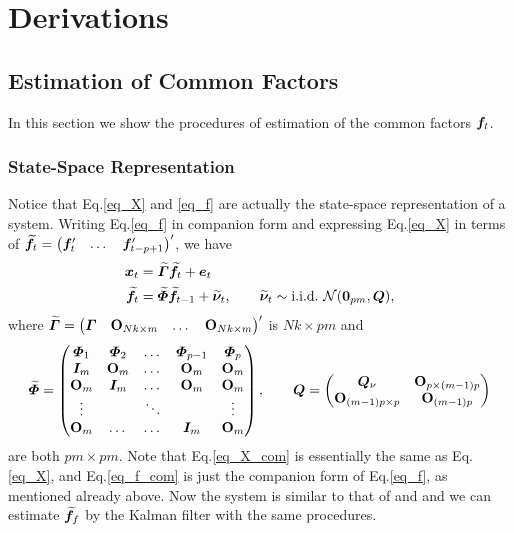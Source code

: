 \section{Derivations}
\subsection{Estimation of Common Factors}
In this section we show the procedures of estimation of the common factors $\bm f_t$. 
\subsubsection{State-Space Representation}
Notice that Eq.\eqref{eq_X} and \eqref{eq_f} are actually the state-space representation of a system. Writing Eq.\eqref{eq_f} in companion form and expressing Eq.\eqref{eq_X} in terms of 
$\widetilde{\bm f}_t=
	\begin{pmatrix}
		\bm f_t'&\dots&\bm f_{t-p+1}'
	\end{pmatrix}'$,
we have
\begin{align}
\label{eq_X_com}
	\bm x_t&=\widetilde{\bm \varGamma}\widetilde{\bm f}_t+\bm e_t\\
\label{eq_f_com}
	\widetilde{\bm f}_t&=\widetilde{\bm \varPhi}\widetilde{\bm f}_{t-1}+\widetilde{\bm \nu}_t,\qquad
		\widetilde{\bm \nu}_t\sim\text{i.i.d.}~\mathcal{N}(\boldsymbol{0}_{pm},\bm Q),
\end{align}
where 
$\widetilde{\bm \varGamma}=
	\begin{pmatrix}
		\bm \varGamma&\mathbf{O}_{Nk\times m}&\dots&\mathbf{O}_{Nk\times m}
	\end{pmatrix}'$
is $Nk\times pm$ and
\begin{equation*}
	\widetilde{\bm \varPhi}=
    	\begin{pmatrix}
    		\bm \varPhi_1&\bm \varPhi_2&\dots&\bm \varPhi_{p-1}&\bm \varPhi_p\\
			\bm I_m&\mathbf{O}_m&\dots&\mathbf{O}_m&\mathbf{O}_m\\
			\mathbf{O}_m&\bm I_m&\dots&\mathbf{O}_m&\mathbf{O}_m\\
			\vdots&&\ddots&&\vdots\\
			\mathbf{O}_m&\dots&\dots&\bm I_m&\mathbf{O}_m
    	\end{pmatrix},\qquad
	\bm Q=
		\begin{pmatrix}
			\bm Q_\nu&\mathbf{O}_{p\times(m-1)p}\\
			\mathbf{O}_{(m-1)p\times p}&\mathbf{O}_{(m-1)p}
		\end{pmatrix}
\end{equation*}
are both $pm\times pm$.
Note that Eq.\eqref{eq_X_com} is essentially the same as Eq.\eqref{eq_X}, and Eq.\eqref{eq_f_com} is just the companion form of Eq.\eqref{eq_f}, as mentioned already above. Now the system is similar to that of \cite{FAVAR} and \cite{FAVAR_sign} and we can estimate $\widetilde{\bm f}_f$ by the Kalman filter with the same procedures.

